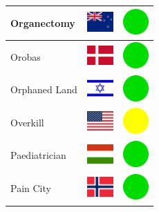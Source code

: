 \documentclass[12pt, a4paper, twoside]{report}
\begin{document}
\begin{center}
\begin{longtable}{|p{5cm}|p{2cm}|p{2cm}|}
 Organectomy                                                & \includegraphics[width=1cm]{../4x3/nz} &   \includegraphics[width=1cm]{../likes/y} \\ \hline
 Orobas                                                     & \includegraphics[width=1cm]{../4x3/dk} &   \includegraphics[width=1cm]{../likes/y} \\ \hline
 Orphaned Land                                              & \includegraphics[width=1cm]{../4x3/il} &   \includegraphics[width=1cm]{../likes/y} \\ \hline
 Overkill                                                   & \includegraphics[width=1cm]{../4x3/us} &   \includegraphics[width=1cm]{../likes/m} \\ \hline
 Paediatrician                                              & \includegraphics[width=1cm]{../4x3/hu} &   \includegraphics[width=1cm]{../likes/y} \\ \hline
 Pain City                                                  & \includegraphics[width=1cm]{../4x3/no} &   \includegraphics[width=1cm]{../likes/y} \\ \hline

\end{longtable}
\end{center}
\end{document}
